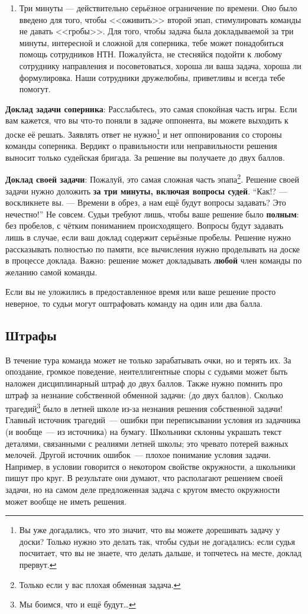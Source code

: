 \documentclass[12pt]{article}
\begin{document}
\begin{enumerate}
\item Три минуты --- действительно серьёзное ограничение по времени. Оно было введено для того, чтобы <<оживить>> второй эпап, стимулировать команды не давать <<гробы>>. Для того, чтобы задача была докладываемой за три минуты, интересной и сложной для соперника, тебе может понадобиться помощь сотрудников НТН. Пожалуйста, не стесняйся подойти к любому сотруднику направления и посоветоваться, хороша ли ваша задача, хороша ли формулировка. Наши сотрудники дружелюбны, приветливы и всегда тебе помогут.
\end{enumerate}
{\bf Доклад задачи соперника}: Расслабьтесь, это самая спокойная часть игры. Если вам кажется, что вы что-то поняли в задаче оппонента, вы можете выходить к доске её решать. Заявлять ответ не нужно\footnote{Вы уже догадались, что это значит, что вы можете дорешивать задачу у доски? Только нужно это делать так, чтобы судьи не догадались: если судья посчитает, что вы не знаете, что делать дальше, и топчетесь на месте, доклад прервут.} и нет оппонирования со стороны команды соперника. Вердикт о правильности или неправильности решения выносит только судейская бригада. За решение вы получаете до двух баллов.

{\bf Доклад своей задачи}: Пожалуй, это самая сложная часть эпапа\footnote{Только если у вас плохая обменная задача.}. Решение своей задачи нужно доложить {\bf за три минуты, включая вопросы судей}. ``Как!? --- воскликнете вы. --- Времени в обрез, а нам ещё будут вопросы задавать? Это нечестно!'' Не совсем. Судьи требуют лишь, чтобы ваше решение было {\bf полным}: без пробелов, с чётким пониманием происходящего. Вопросы будут задавать лишь в случае, если ваш доклад содержит серьёзные пробелы. Решение нужно рассказывать полностью по памяти, все вычисления нужно проделывать на доске в процессе доклада. Важно: решение может докладывать {\bf любой} член команды по желанию самой команды.

Если вы не уложились в предоставленное время или ваше решение просто неверное, то судьи могут оштрафовать команду на один или два балла.

\subsection*{Штрафы}
В течение тура команда может не только зарабатывать очки, но и терять их. За опоздание, громкое поведение, неителлигентные споры с судьями может быть наложен дисциплинарный штраф до двух баллов. Также нужно помнить про штраф за незнание собственной обменной задачи: (до двух баллов). Сколько трагедий\footnote{Мы боимся, что и ещё будут\ldots} было в летней школе из-за незнания решения собственной задачи! Главный источник трагедий~--- ошибки при переписывании условия из задачника (и вообще~--- из источника) на бумагу. Школьники склонны украшать текст деталями, связанными с реалиями летней школы; это чревато потерей важных мелочей. Другой источник ошибок~--- плохое понимание условия задачи. Например, в условии говорится о некотором свойстве окружности, а школьники пишут про круг. В результате они думают, что располагают решением своей задачи, но на самом деле предложенная задача с кругом вместо окружности может вообще не иметь решения.
\end{document}
